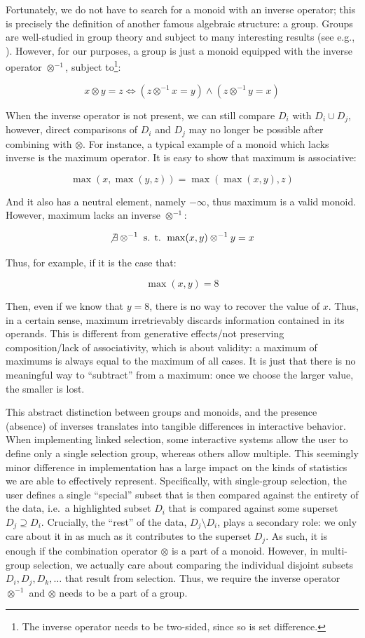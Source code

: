 \documentclass[
]{book}
\theoremstyle{definition}
\theoremstyle{definition}
\theoremstyle{definition}
\theoremstyle{definition}
\theoremstyle{remark}
\begin{document}
Fortunately, we do not have to search for a monoid with an inverse operator; this is precisely the definition of another famous algebraic structure: a group. Groups are well-studied in group theory and subject to many interesting results (see e.g., ). However, for our purposes, a group is just a monoid equipped with the inverse operator \(\otimes^{-1}\), subject to\footnote{The inverse operator needs to be two-sided, since so is set difference.}:

\[x \otimes y = z \iff (z \otimes^{-1} x = y) \wedge (z \otimes^{-1} y = x)\]

When the inverse operator is not present, we can still compare \(D_i\) with \(D_i \cup D_j\), however, direct comparisons of \(D_i\) and \(D_j\) may no longer be possible after combining with \(\otimes\). For instance, a typical example of a monoid which lacks inverse is the maximum operator. It is easy to show that maximum is associative:

\[\max(x, \max(y, z)) = \max(\max(x, y), z)\]

And it also has a neutral element, namely \(-\infty\), thus maximum is a valid monoid. However, maximum lacks an inverse \(\otimes^{-1}\):

\[\not \exists \otimes^{-1} \text{ s. t. } \max(x, y) \otimes^{-1} y = x\]

Thus, for example, if it is the case that:

\[\max(x, y) = 8\]

Then, even if we know that \(y = 8\), there is no way to recover the value of \(x\). Thus, in a certain sense, maximum irretrievably discards information contained in its operands. This is different from generative effects/not preserving composition/lack of associativity, which is about validity: a maximum of maximums is always equal to the maximum of all cases. It is just that there is no meaningful way to ``subtract'' from a maximum: once we choose the larger value, the smaller is lost.

This abstract distinction between groups and monoids, and the presence (absence) of inverses translates into tangible differences in interactive behavior. When implementing linked selection, some interactive systems allow the user to define only a single selection group, whereas others allow multiple. This seemingly minor difference in implementation has a large impact on the kinds of statistics we are able to effectively represent. Specifically, with single-group selection, the user defines a single ``special'' subset that is then compared against the entirety of the data, i.e.~a highlighted subset \(D_i\) that is compared against some superset \(D_j \supseteq D_i\). Crucially, the ``rest'' of the data, \(D_j \setminus D_i\), plays a secondary role: we only care about it in as much as it contributes to the superset \(D_j\). As such, it is enough if the combination operator \(\otimes\) is a part of a monoid. However, in multi-group selection, we actually care about comparing the individual disjoint subsets \(D_i, D_j, D_k, \ldots\) that result from selection. Thus, we require the inverse operator \(\otimes^{-1}\) and \(\otimes\) needs to be a part of a group.
\end{document}
